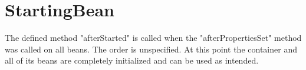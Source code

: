 \section{StartingBean}
\label{feature:StartingBean}
\ClearAPI
The defined method "afterStarted" is called when the "afterPropertiesSet" method was called on all beans. The order is unspecified. At this point the container and all of its beans are completely initialized and can be used as intended.
